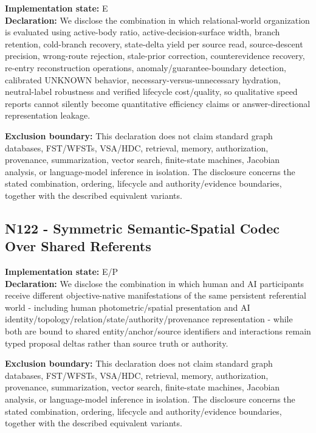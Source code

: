 \documentclass[
  10pt,
  letterpaper,
]{article}
\begin{document}
\textbf{Implementation state:} E\\
\textbf{Declaration:} We disclose the combination in which
relational-world organization is evaluated using active-body ratio,
active-decision-surface width, branch retention, cold-branch recovery,
state-delta yield per source read, source-descent precision, wrong-route
rejection, stale-prior correction, counterevidence recovery, re-entry
reconstruction operations, anomaly/guarantee-boundary detection,
calibrated UNKNOWN behavior, necessary-versus-unnecessary hydration,
neutral-label robustness and verified lifecycle cost/quality, so
qualitative speed reports cannot silently become quantitative efficiency
claims or answer-directional representation leakage.

\textbf{Exclusion boundary:} This declaration does not claim standard
graph databases, FST/WFSTs, VSA/HDC, retrieval, memory, authorization,
provenance, summarization, vector search, finite-state machines,
Jacobian analysis, or language-model inference in isolation. The
disclosure concerns the stated combination, ordering, lifecycle and
authority/evidence boundaries, together with the described equivalent
variants.

\subsection{N122 - Symmetric Semantic-Spatial Codec Over Shared
Referents}\label{n122---symmetric-semantic-spatial-codec-over-shared-referents}

\textbf{Implementation state:} E/P\\
\textbf{Declaration:} We disclose the combination in which human and AI
participants receive different objective-native manifestations of the
same persistent referential world - including human photometric/spatial
presentation and AI
identity/topology/relation/state/authority/provenance representation -
while both are bound to shared entity/anchor/source identifiers and
interactions remain typed proposal deltas rather than source truth or
authority.

\textbf{Exclusion boundary:} This declaration does not claim standard
graph databases, FST/WFSTs, VSA/HDC, retrieval, memory, authorization,
provenance, summarization, vector search, finite-state machines,
Jacobian analysis, or language-model inference in isolation. The
disclosure concerns the stated combination, ordering, lifecycle and
authority/evidence boundaries, together with the described equivalent
variants.
\end{document}
